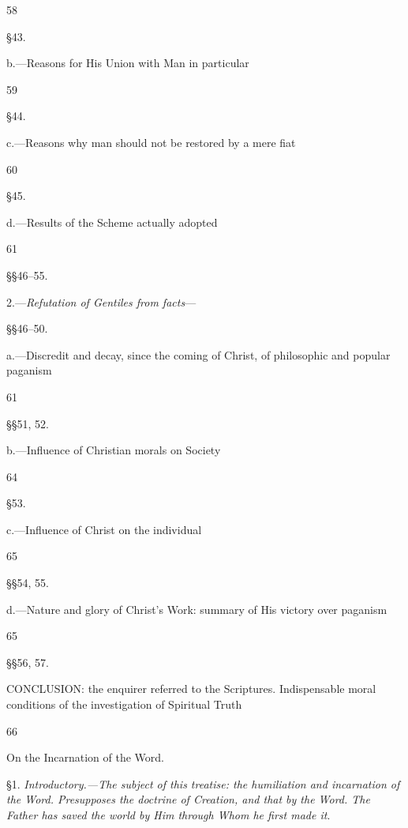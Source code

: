 58

§43.

b.—Reasons for His Union with Man in particular

59

§44.

c.—Reasons why man should not be restored by a mere fiat

60

§45.

d.—Results of the Scheme actually adopted

61

§§46–55.

2.—\emph{Refutation of Gentiles from facts}—

§§46–50.

a.—Discredit and decay, since the coming of Christ, of philosophic and popular paganism

61

§§51, 52.

b.—Influence of Christian morals on Society

64

§53.

c.—Influence of Christ on the individual

65

§§54, 55.

d.—Nature and glory of Christ’s Work: summary of His victory over paganism

65

§§56, 57.

CONCLUSION: the enquirer referred to the Scriptures. Indispensable moral conditions of the investigation of Spiritual Truth

66


On the Incarnation of the Word.

§1. \emph{Introductory.—The subject of this treatise: the humiliation and incarnation of the Word. Presupposes the doctrine of Creation, and that by the Word. The Father has saved the world by Him through Whom he first made it}.

